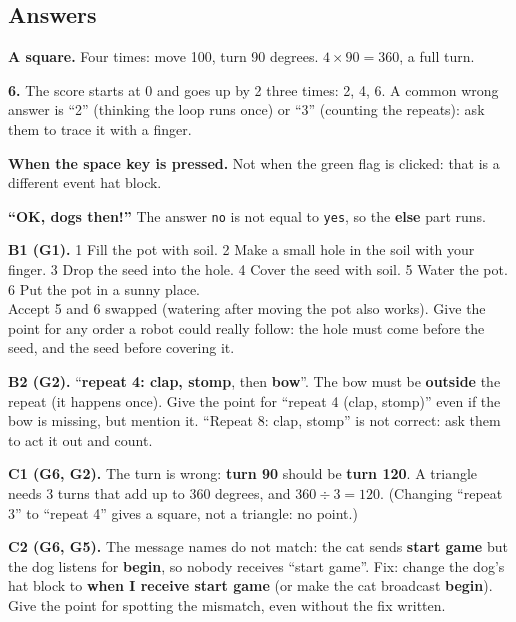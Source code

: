 \subsection{Answers}
\begin{answer}
\begin{description}[leftmargin=0pt,itemsep=3pt,font=\bfseries]
  \item[A1 (G2).] \textbf{A square.} Four times: move 100, turn 90 degrees. $4 \times 90 = 360$, a full turn.
  \item[A2 (G4).] \textbf{6.} The score starts at 0 and goes up by 2 three times: 2, 4, 6.
        A common wrong answer is \enquote{2} (thinking the loop runs once) or \enquote{3} (counting the repeats): ask them to trace it with a finger.
  \item[A3 (G3).] \textbf{When the space key is pressed.} Not when the green flag is clicked: that is a different event hat block.
  \item[A4 (G3).] \textbf{\enquote{OK, dogs then!}} The answer \texttt{no} is not equal to \texttt{yes}, so the \textbf{else} part runs.
\end{description}
\end{answer}

\begin{answer}
\textbf{B1 (G1).} 1 Fill the pot with soil. 2 Make a small hole in the soil with your finger.
3 Drop the seed into the hole. 4 Cover the seed with soil. 5 Water the pot. 6 Put the pot in a sunny place.\\
Accept 5 and 6 swapped (watering after moving the pot also works). Give the point for any order a robot could really follow:
the hole must come before the seed, and the seed before covering it.

\textbf{B2 (G2).} \enquote{\textbf{repeat 4: clap, stomp}, then \textbf{bow}}. The bow must be \textbf{outside} the repeat
(it happens once). Give the point for \enquote{repeat 4 (clap, stomp)} even if the bow is missing, but mention it.
\enquote{Repeat 8: clap, stomp} is not correct: ask them to act it out and count.
\end{answer}

\begin{answer}
\textbf{C1 (G6, G2).} The turn is wrong: \textbf{turn 90} should be \textbf{turn 120}. A triangle needs 3 turns that add up
to 360 degrees, and $360 \div 3 = 120$. (Changing \enquote{repeat 3} to \enquote{repeat 4} gives a square, not a triangle: no point.)

\textbf{C2 (G6, G5).} The message names do not match: the cat sends \textbf{start game} but the dog listens for
\textbf{begin}, so nobody receives \enquote{start game}. Fix: change the dog's hat block to \textbf{when I receive start game}
(or make the cat broadcast \textbf{begin}). Give the point for spotting the mismatch, even without the fix written.
\end{answer}

